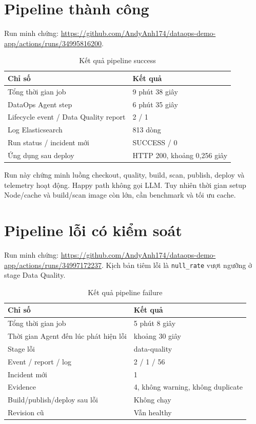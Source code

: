 \documentclass[12pt,a4paper,oneside]{report}
\newcommand{\code}[1]{\texttt{#1}}
\begin{document}
\section{Pipeline thành công}

Run minh chứng: \url{https://github.com/AndyAnh174/dataops-demo-app/actions/runs/34995816200}.

\begin{table}[H]
\centering
\caption{Kết quả pipeline success}
\label{tab:success-run}
\begin{tabularx}{\textwidth}{Y C{5cm}}
\toprule
\textbf{Chỉ số} & \textbf{Kết quả} \\
\midrule
Tổng thời gian job & 9 phút 38 giây \\
DataOps Agent step & 6 phút 35 giây \\
Lifecycle event / Data Quality report & 2 / 1 \\
Log Elasticsearch & 813 dòng \\
Run status / incident mới & SUCCESS / 0 \\
Ứng dụng sau deploy & HTTP 200, khoảng 0,256 giây \\
\bottomrule
\end{tabularx}
\end{table}

Run này chứng minh luồng checkout, quality, build, scan, publish, deploy và telemetry hoạt động.
Happy path không gọi LLM. Tuy nhiên thời gian setup Node/cache và build/scan image còn lớn, cần
benchmark và tối ưu cache.

\section{Pipeline lỗi có kiểm soát}

Run minh chứng: \url{https://github.com/AndyAnh174/dataops-demo-app/actions/runs/34997172237}.
Kịch bản tiêm lỗi là \code{null\_rate} vượt ngưỡng ở stage Data Quality.

\begin{table}[H]
\centering
\caption{Kết quả pipeline failure}
\label{tab:failure-run}
\begin{tabularx}{\textwidth}{Y C{5cm}}
\toprule
\textbf{Chỉ số} & \textbf{Kết quả} \\
\midrule
Tổng thời gian job & 5 phút 8 giây \\
Thời gian Agent đến lúc phát hiện lỗi & khoảng 30 giây \\
Stage lỗi & data-quality \\
Event / report / log & 2 / 1 / 56 \\
Incident mới & 1 \\
Evidence & 4, không warning, không duplicate \\
Build/publish/deploy sau lỗi & Không chạy \\
Revision cũ & Vẫn healthy \\
\bottomrule
\end{tabularx}
\end{table}
\end{document}
